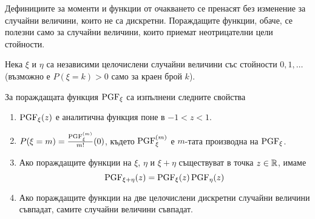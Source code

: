 \documentclass[numbers=endperiod, DIV=15, bibliography=totocnumbered]{scrartcl}
\begin{document}
\begin{note}
  Дефинициите за моменти и функции от очакването се пренасят без изменение за случайни величини, които не са дискретни. Пораждащите функции, обаче, се полезни само за случайни величини, които приемат неотрицателни цели стойности.
\end{note}

\begin{theorem}\label{thm:pgf-props}
  Нека $\xi$ и $\eta$ са независими целочислени случайни величини със стойности $0, 1, \ldots$ (възможно е $P(\xi = k) > 0$ само за краен брой $k$).

  За пораждащата функция $\operatorname{PGF}_\xi$ са изпълнени следните свойства
  \begin{enumerate}
    \item $\operatorname{PGF}_\xi(z)$ е аналитична функция поне в $-1 < z < 1$.
    \item $P(\xi = m) = \frac {\operatorname{PGF}_\xi^{(m)}} {m!} (0)$, където $\operatorname{PGF}_\xi^{(m)}$ е $m$-тата производна на $\operatorname{PGF}_\xi$.
    \item Ако пораждащите функции на $\xi$, $\eta$ и $\xi + \eta$ съществуват в точка $z \in \mathbb{R}$, имаме
    \begin{displaymath}
      \operatorname{PGF}_{\xi + \eta}(z) = \operatorname{PGF}_\xi(z) \operatorname{PGF}_\eta(z)
    \end{displaymath}

    \item Ако пораждащите функции на две целочислени дискретни случайни величини съвпадат, самите случайни величини съвпадат.
  \end{enumerate}
\end{theorem}
\end{document}
